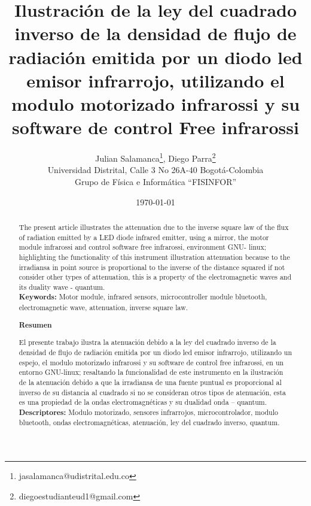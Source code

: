 \documentclass[12]{article}
\title{\bf{Ilustración de la ley del cuadrado inverso de la densidad de flujo de radiación emitida por un diodo led emisor infrarrojo, utilizando el modulo motorizado infrarossi y su software de control Free infrarossi}}
\author{Julian Salamanca\footnote{jasalamanca@udistrital.edu.co}, Diego Parra\footnote{diegoestudianteud1@gmail.com} \\
  Universidad Distrital, Calle 3 No 26A-40 Bogotá-Colombia\\
  Grupo de Física e Informática ``FISINFOR''
}
\date{\today}
\def\tablename{Tabla}%
\begin{document}
\renewcommand{\tablename}{Tabla}
\maketitle
\vspace{-0.8cm}

\begin{abstract}
The present article illustrates the attenuation due to the inverse square law of the flux of radiation emitted by a LED diode infrared emitter, using a mirror, the motor module  infrarossi and control software free infrarossi, environment GNU- linux; highlighting the functionality of this instrument  illustration attenuation because to the irradiansa in point source is proportional to the inverse of the distance squared if not consider other types of attenuation, this is a property of the electromagnetic waves and its duality wave - quantum.\\
{\bf{Keywords:}} Motor module, infrared sensors, microcontroller module bluetooth, electromagnetic wave, attenuation, inverse square law.


\begin{center}
{\bf{Resumen}} 
\end{center}
El presente trabajo ilustra la atenuación debido a la ley del cuadrado inverso de la densidad de flujo de radiación emitida por un diodo led emisor infrarrojo, utilizando un espejo, el modulo motorizado  infrarossi y su software de control free infrarossi, en un entorno GNU-linux; resaltando la funcionalidad de este instrumento en la ilustración de la atenuación debido a que la irradiansa de una fuente puntual es proporcional al inverso de su distancia al cuadrado si no se consideran otros tipos de atenuación, esta es una  propiedad de la ondas electromagnéticas y su dualidad onda – quantum. \\
{\bf{Descriptores:}} Modulo motorizado, sensores infrarrojos, microcontrolador, modulo bluetooth, ondas electromagnéticas, atenuación, ley del cuadrado inverso, quantum. 
\end{abstract}


\end{document}
